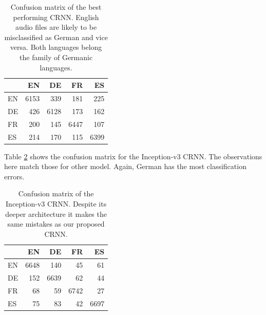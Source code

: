 	
	\begin{table}[h]
	\centering
	\begin{tabularx}{\textwidth}{l|rrrr}
	      & EN     & DE     & FR     & ES \\ \midrule
	  EN  & 6153   & 339    & 181    & 225 \\
	  DE  & 426    & 6128   & 173    & 162 \\
	  FR  & 200    & 145    & 6447   & 107 \\
	  ES  & 214    & 170    & 115    & 6399 \\
	\end{tabularx}
	\caption{Confusion matrix of the best performing CRNN. English audio files are likely to be misclassified as German and vice versa. Both languages belong the family of Germanic languages. }
	\label{tab:language_family_crnn}
	\end{table}
	
	Table \ref{tab:language_family_inception} shows the confusion matrix for the Inception-v3 CRNN. The observations here match those for other model. Again, German has the most classification errors. 
	
	\begin{table}[h]
	\centering
	\begin{tabularx}{\textwidth}{l|rrrr}
	      & EN     & DE     & FR     & ES \\ \midrule
	  EN  & 6648   & 140    & 45     & 61 \\
	  DE  & 152    & 6639   & 62     & 44 \\
	  FR  & 68     & 59     & 6742   & 27 \\
	  ES  & 75     & 83     & 42     & 6697 \\
	\end{tabularx}
	\caption{Confusion matrix of the Inception-v3 CRNN. Despite its deeper architecture it makes the same mistakes as our proposed CRNN. }
	\label{tab:language_family_inception}
	\end{table}
 


